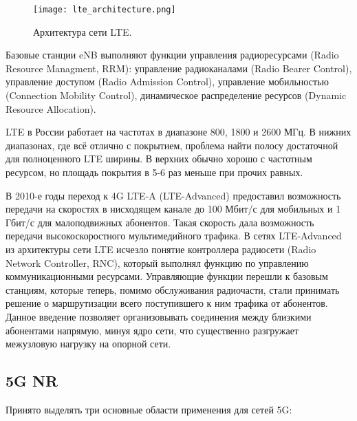 
\begin{figure}[h!]
  \centering
   \texttt{[image: lte\_architecture.png]}
\caption{Архитектура сети LTE.}
\label{fig:part1_lte_architecture}
\end{figure}

Базовые станции eNB выполняют функции управления радиоресурсами (Radio Resource Managment, RRM): управление радиоканалами (Radio Bearer Control), управление доступом (Radio Admission Control), управление мобильностью (Connection Mobility Control), динамическое распределение ресурсов (Dynamic Resource Allocation).

LTE в России работает на частотах в диапазоне 800, 1800 и 2600 МГц. В нижних диапазонах, где всё отлично с покрытием, проблема найти полосу достаточной для полноценного LTE ширины. В верхних обычно хорошо с частотным ресурсом, но площадь покрытия в 5-6 раз меньше при прочих равных. 

В 2010-е годы переход к 4G LTE-A (LTE-Advanced) предоставил возможность передачи на скоростях в нисходящем канале до 100 Мбит/с для мобильных и 1 Гбит/с для малоподвижных абонентов. Такая скорость дала возможность передачи высокоскоростного мультимедийного трафика. В сетях LTE-Advanced из архитектуры сети LTE исчезло понятие контроллера радиосети (Radio Network Controller, RNC), который выполнял функцию по управлению коммуникационными ресурсами. Управляющие функции перешли к базовым станциям, которые теперь, помимо обслуживания радиочасти, стали принимать решение о маршрутизации всего поступившего к ним трафика от абонентов. Данное введение позволяет организовывать соединения между близкими абонентами напрямую, минуя ядро сети, что существенно разгружает межузловую нагрузку на опорной сети. 


\subsection{5G NR}



Принято выделять три основные области применения для сетей 5G:

